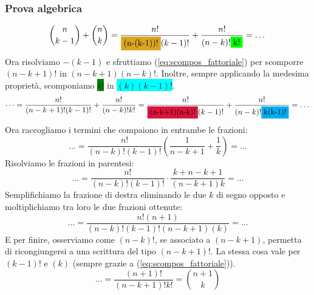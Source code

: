 \documentclass[12pt]{article}
\begin{document}
\subsubsection{Prova algebrica}
\[
    \binom{n}{k-1} + \binom{n}{k} = \dfrac{n!}{\colorbox{goldenrod_yellow}{(n-(k-1))!}(k-1)!} + \dfrac{n!}{(n-k)!\colorbox{green}{k!}} = \dots
\]
Ora risolviamo \colorbox{goldenrod_yellow}{$-(k-1)$} e sfruttiamo (\ref{eq:scompos_fattoriale}) per scomporre \colorbox{goldenrod_yellow}{$(n-k+1)!$} in \colorbox{crimson_red}{$(n-k+1)(n-k)!$}. Inoltre, sempre applicando la medesima proprietà, scomponiamo \colorbox{green}{$k!$} in \colorbox{cyan}{$(k)(k-1)!$}.
\[
    \dots = \dfrac{n!}{(n-k+1)!(k-1)!} + \dfrac{n!}{(n-k)!k!} = \dfrac{n!}{\colorbox{crimson_red}{(n-k+1)(n-k)!}(k-1)!} + \dfrac{n!}{(n-k)!\colorbox{cyan}{k(k-1)!}} = \dots
\]
Ora raccogliamo i termini che compaiono in entrambe le frazioni:
\[
    \dots = \dfrac{n!}{(n-k)!(k-1)!}\left(\dfrac{1}{n-k+1} + \dfrac{1}{k}\right) = \dots
\]
Risolviamo le frazioni in parentesi:
\[
    \dots = \dfrac{n!}{(n-k)!(k-1)!} \cdot \dfrac{k + n -k + 1}{(n-k+1)k} = \dots
\]
Semplifichiamo la frazione di destra eliminando le due $k$ di segno opposto e moltiplichiamo tra loro le due frazioni ottenute:
\[
    \dots = \dfrac{n!(n+1)}{(n-k)!(k-1)!(n-k+1)(k)} = \dots
\]
E per finire, osserviamo come $(n-k)!$, se associato a $(n-k+1)$, permetta di ricongiungersi a una scrittura del tipo $(n-k+1)!$. La stessa cosa vale per $(k-1)!$ e $(k)$ (sempre grazie a (\ref{eq:scompos_fattoriale})).
\[
    \dots = \dfrac{(n+1)!}{(n-k+1)!k!} = \binom{n+1}{k}
\]
\end{document}
